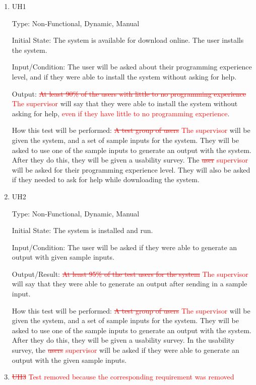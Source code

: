 \documentclass[12pt, titlepage]{article}
\begin{document}
\begin{enumerate}

\item{UH1\\}\label{UH1}

Type: Non-Functional, Dynamic, Manual
					
Initial State: 
The system is available for download online. The user installs the system.

Input/Condition: 
The user will be asked about their programming experience level, and if they were able to install the system without asking for help.	

Output: 
\textcolor{red}{\sout{At least 90\% of the users with little to no programming experience} The supervisor} will say that they were able to install the system without asking for help, \textcolor{red}{even if they have little to no programming experience}.

How this test will be performed: 
\textcolor{red}{\sout{A test group of users} The supervisor} will be given the system, and a set of sample inputs for the system. They will be asked to use one of the sample inputs to generate an output with the system. After they do this, they will be given a usability survey. The \textcolor{red}{\sout{user} supervisor} will be asked for their programming experience level. They will also be asked if they needed to ask for help while downloading the system.
\\
\item{UH2\\}\label{UH2}

Type: Non-Functional, Dynamic, Manual
					
Initial State: 
The system is installed and run.

Input/Condition: 
The user will be asked if they were able to generate an output with given sample inputs.

Output/Result: 
\textcolor{red}{\sout{At least 95\% of the test users for the system} The supervisor} will say that they were able to generate an output after sending in a sample input.
					
How this test will be performed:
\textcolor{red}{\sout{A test group of users} The supervisor} will be given the system, and a set of sample inputs for the system. They will be asked to use one of the sample inputs to generate an output with the system. After they do this, they will be given a usability survey. In the usability survey, the \textcolor{red}{\sout{users} supervisor} will be asked if they were able to generate an output with the given sample inputs.
\\
\item{{\textcolor{red}{\sout{UH3} Test removed because the corresponding requirement was removed}}\\}\label{UH3}


\end{enumerate}
\end{document}
